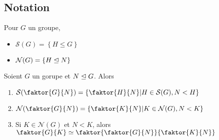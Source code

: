 \documentclass[../main.tex]{subfiles}
\begin{document}
\subsection*{Notation}
Pour $G$ un groupe,
\begin{itemize}
	\item $ \mathcal{S}( G) = \left\{ H \leq G \right\} $ 
	\item $ \mathcal{N}( G) = \left\{ H \trianglelefteq N \right\} $ 
\end{itemize}
\begin{thm}
	Soient $G$ un gorupe et $ N \trianglelefteq G$. Alors
	\begin{enumerate}
		\item $ \mathcal{S}( \faktor {G} {N} ) = \left\{ \faktor {H} { N} | H \in \mathcal{S}( G), N<H \right\}  $ 
		\item $ \mathcal{N}( \faktor {G} {N} ) = \left\{ \faktor {K} {N} | K \in \mathcal{N}( G), N <K  \right\} $ 
		\item Si $K \in  \mathcal{N}( G) $ et $N <K$, alors $ \faktor {G} {K} \simeq \faktor { \faktor {G} {N} } { \faktor {K} {N}} $
	\end{enumerate}
			
\end{thm}
\end{document}
